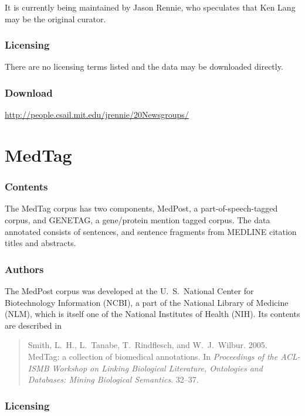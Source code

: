 It is currently being maintained by Jason Rennie, who speculates that
Ken Lang may be the original curator.

\subsubsection{Licensing}

There are no licensing terms listed and the data may be downloaded
directly.

\subsubsection{Download}

\url{http://people.csail.mit.edu/jrennie/20Newsgroups/}




\section{MedTag}\label{section:corpora-medtag}

\subsubsection{Contents}

The MedTag corpus has two components, MedPost, a part-of-speech-tagged
corpus, and GENETAG, a gene/protein mention tagged corpus.  The data
annotated consists of sentences, and sentence fragments from MEDLINE
citation titles and abstracts.

\subsubsection{Authors}

The MedPost corpus was developed at the U.~S.~National Center for
Biotechnology Information (NCBI), a part of the National Library of
Medicine (NLM), which is itself one of the National Institutes of
Health (NIH).  Its contents are described in
%
\begin{quote}
Smith, L.~H., L.~Tanabe, T.~Rindflesch, and W.~J.~Wilbur.
2005. MedTag: a collection of biomedical annotations.  In {\it
  Proceedings of the ACL-ISMB Workshop on Linking Biological
  Literature, Ontologies and Databases: Mining Biological
  Semantics}. 32--37.
\end{quote}

\subsubsection{Licensing}

